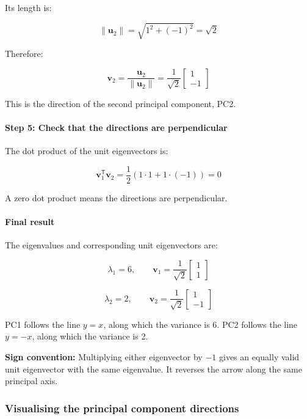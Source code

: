 \documentclass[11pt]{article}
\begin{document}
Its length is:

\[
\|\mathbf{u}_2\|
=
\sqrt{1^2+(-1)^2}
=
\sqrt{2}
\]

Therefore:

\[
\boxed{
\mathbf{v}_2
=
\frac{\mathbf{u}_2}{\|\mathbf{u}_2\|}
=
\frac{1}{\sqrt{2}}
\begin{bmatrix}
1\\
-1
\end{bmatrix}
}
\]

This is the direction of the second principal component, PC2.

\paragraph{Step 5: Check that the directions are
perpendicular}\label{step-5-check-that-the-directions-are-perpendicular}

The dot product of the unit eigenvectors is:

\[
\mathbf{v}_1^\mathsf{T}\mathbf{v}_2
=
\frac{1}{2}\left(1\cdot1+1\cdot(-1)\right)
=
0
\]

A zero dot product means the directions are perpendicular.

\paragraph{Final result}\label{final-result}

The eigenvalues and corresponding unit eigenvectors are:

\[
\boxed{
\lambda_1=6,
\qquad
\mathbf{v}_1=
\frac{1}{\sqrt{2}}
\begin{bmatrix}
1\\
1
\end{bmatrix}
}
\]

\[
\boxed{
\lambda_2=2,
\qquad
\mathbf{v}_2=
\frac{1}{\sqrt{2}}
\begin{bmatrix}
1\\
-1
\end{bmatrix}
}
\]

PC1 follows the line \(y=x\), along which the variance is 6. PC2 follows
the line \(y=-x\), along which the variance is 2.

\textbf{Sign convention:} Multiplying either eigenvector by \(-1\) gives
an equally valid unit eigenvector with the same eigenvalue. It reverses
the arrow along the same principal axis.

\subsubsection{Visualising the principal component
directions}\label{visualising-the-principal-component-directions}
\end{document}
